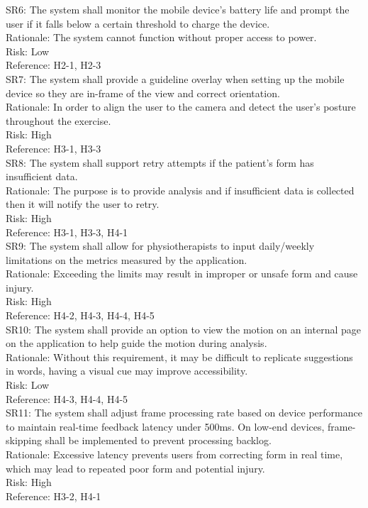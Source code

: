 \documentclass{article}
\begin{document}
\noindent
SR6: The system shall monitor the mobile device's battery life and prompt the user if it falls below a certain threshold to charge the device.\\
Rationale: The system cannot function without proper access to power.\\
Risk: Low\\
Reference: H2-1, H2-3\\


\noindent
SR7: The system shall provide a guideline overlay when setting up the mobile device so they are in-frame of the view and correct orientation.\\
Rationale: In order to align the user to the camera and detect the user's posture throughout the exercise.\\
Risk: High\\
Reference: H3-1, H3-3\\


\noindent
SR8: The system shall support retry attempts if the patient's form has insufficient data.\\
Rationale: The purpose is to provide analysis and if insufficient data is collected then it will notify the user to retry.\\
Risk: High\\
Reference: H3-1, H3-3, H4-1\\


\noindent
SR9: The system shall allow for physiotherapists to input daily/weekly limitations on the metrics measured by the application.\\
Rationale: Exceeding the limits may result in improper or unsafe form and cause injury.\\
Risk: High\\
Reference: H4-2, H4-3, H4-4, H4-5\\


\noindent
SR10: The system shall provide an option to view the motion on an internal page on the application to help guide the motion during analysis.\\
Rationale: Without this requirement, it may be difficult to replicate suggestions in words, having a visual cue may improve accessibility.\\
Risk: Low\\
Reference: H4-3, H4-4, H4-5\\

\noindent
SR11: The system shall adjust frame processing rate based on device performance to maintain real-time feedback latency under 500ms. On low-end devices, frame-skipping shall be implemented to prevent processing backlog.\\
Rationale: Excessive latency prevents users from correcting form in real time, which may lead to repeated poor form and potential injury.\\
Risk: High\\
Reference: H3-2, H4-1\\
\end{document}
